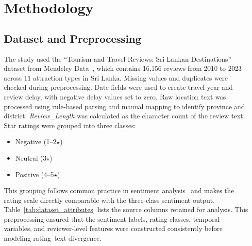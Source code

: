 \documentclass[conference]{IEEEtran}
\begin{document}
\section{Methodology}


\begin{table}[htbp]
\caption{Methodology Overview}
\label{tab:methodology_overview}
\centering
{}
\end{table}

\subsection{Dataset and Preprocessing}

The study used the ``Tourism and Travel Reviews: Sri Lankan Destinations'' dataset from Mendeley Data~\cite{Sewwandi}, which contains 16,156 reviews from 2010 to 2023 across 11 attraction types in Sri Lanka. Missing values and duplicates were checked during preprocessing. Date fields were used to create travel year and review delay, with negative delay values set to zero. Raw location text was processed using rule-based parsing and manual mapping to identify province and district. \textit{Review\_Length} was calculated as the character count of the review text. Star ratings were grouped into three classes:
\begin{itemize}
    \item Negative (1--2$\star$)
    \item Neutral (3$\star$)
    \item Positive (4--5$\star$)
\end{itemize}
This grouping follows common practice in sentiment analysis~\cite{Pang,alaei} and makes the rating scale directly comparable with the three-class sentiment output. Table~\ref{tab:dataset_attributes} lists the source columns retained for analysis. This preprocessing ensured that the sentiment labels, rating classes, temporal variables, and reviewer-level features were constructed consistently before modeling rating--text divergence.
\end{document}
